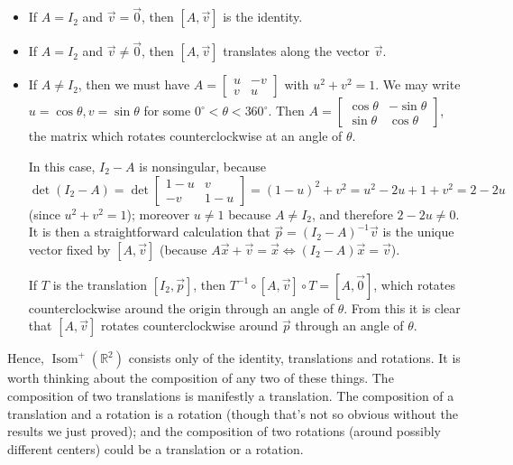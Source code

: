 \documentclass[leqno]{book}
\begin{document}
\begin{itemize}
\item If $A=I_2$ and $\vec v=\vec 0$, then $[A,\vec v]$ is the identity.

\item If $A=I_2$ and $\vec v\ne\vec 0$, then $[A,\vec v]$ translates along the vector $\vec v$.

\item If $A\ne I_2$, then we must have $A=\begin{bmatrix}u&-v\\v&u\end{bmatrix}$ with $u^2+v^2=1$.  We may write $u=\cos\theta,v=\sin\theta$ for some $0^\circ<\theta<360^\circ$.  Then $A=\begin{bmatrix}\cos\theta&-\sin\theta\\\sin\theta&\cos\theta\end{bmatrix}$, the matrix which rotates counterclockwise at an angle of $\theta$.

In this case, $I_2-A$ is nonsingular, because $\det(I_2-A)=\det\begin{bmatrix}1-u&v\\-v&1-u\end{bmatrix}=(1-u)^2+v^2=u^2-2u+1+v^2=2-2u$ (since $u^2+v^2=1$); moreover $u\ne 1$ because $A\ne I_2$, and therefore $2-2u\ne 0$.  It is then a straightforward calculation that $\vec p=(I_2-A)^{-1}\vec v$ is the unique vector fixed by $[A,\vec v]$ (because $A\vec x+\vec v=\vec x\iff(I_2-A)\vec x=\vec v$).

If $T$ is the translation $[I_2,\vec p]$, then $T^{-1}\circ[A,\vec v]\circ T=[A,\vec 0]$, which rotates counterclockwise around the origin through an angle of $\theta$.  From this it is clear that $[A,\vec v]$ rotates counterclockwise around $\vec p$ through an angle of $\theta$. %
\end{itemize}
\noindent Hence, $\operatorname{Isom}^+(\mathbb R^2)$ consists only of the identity, translations and rotations.  It is worth thinking about the composition of any two of these things.  The composition of two translations is manifestly a translation.  The composition of a translation and a rotation is a rotation (though that's not so obvious without the results we just proved); and the composition of two rotations (around possibly different centers) could be a translation or a rotation.
\end{document}
